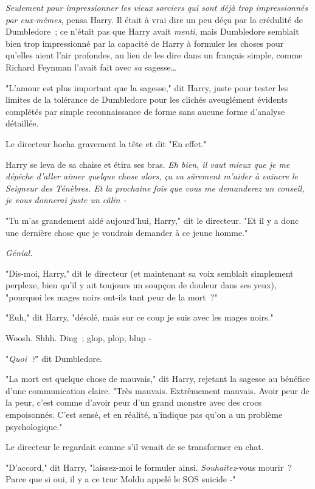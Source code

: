 \emph{Seulement pour impressionner les vieux sorciers qui sont déjà trop impressionnés par eux-mêmes}, pensa Harry. Il était à vrai dire un peu déçu par la crédulité de Dumbledore~; ce n'était pas que Harry avait \emph{menti}, mais Dumbledore semblait bien trop impressionné par la capacité de Harry à formuler les choses pour qu'elles aient l'air profondes, au lieu de les dire dans un français simple, comme Richard Feynman l'avait fait avec \emph{sa} sagesse…

"L'amour est plus important que la sagesse," dit Harry, juste pour tester les limites de la tolérance de Dumbledore pour les clichés aveuglément évidents complétés par simple reconnaissance de forme sans aucune forme d'analyse détaillée.

Le directeur hocha gravement la tête et dit "En effet."

Harry se leva de sa chaise et étira ses bras. \emph{Eh bien, il vaut mieux que je me dépêche d'aller aimer quelque chose alors, ça va sûrement m'aider à vaincre le Seigneur des Ténèbres. Et la prochaine fois que vous me demanderez un conseil, je vous donnerai juste un câlin -}

"Tu m'as grandement aidé aujourd'hui, Harry," dit le directeur. "Et il y a donc une dernière chose que je voudrais demander à ce jeune homme."

\emph{Génial.}

"Dis-moi, Harry," dit le directeur (et maintenant sa voix semblait simplement perplexe, bien qu'il y ait toujours un soupçon de douleur dans ses yeux), "pourquoi les mages noirs ont-ils tant peur de la mort~?"

"Euh," dit Harry, "désolé, mais sur ce coup je suis avec les mages noirs."

Woosh. Shhh. Ding~; glop, plop, blup -

"\emph{Quoi~?}" dit Dumbledore.

"La mort est quelque chose de mauvais," dit Harry, rejetant la sagesse au bénéfice d'une communication claire. "Très mauvais. Extrêmement mauvais. Avoir peur de la peur, c'est comme d'avoir peur d'un grand monstre avec des crocs empoisonnés. C'est sensé, et en réalité, n'indique pas qu'on a un problème psychologique."

Le directeur le regardait comme s'il venait de se transformer en chat.

"D'accord," dit Harry, "laissez-moi le formuler ainsi. \emph{Souhaitez}-vous mourir~? Parce que si oui, il y a ce truc Moldu appelé le SOS suicide -"

